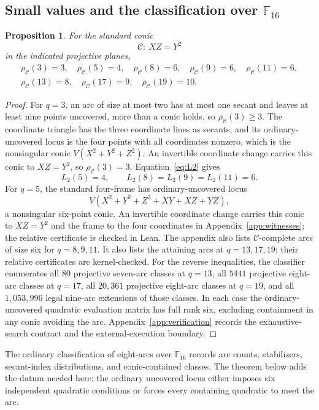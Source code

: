 \documentclass[11pt]{article}
\newtheorem{proposition}[theorem]{Proposition}
\theoremstyle{definition}
\theoremstyle{remark}
\newcommand{\F}{\mathbb{F}}
\newcommand{\cC}{\mathcal{C}}
\newcommand{\rhoC}{\rho_{\cC}}
\begin{document}
\subsection{Small values and the classification over
\texorpdfstring{$\F_{16}$}{F16}}

\begin{proposition}\label{prop:small-values}
For the standard conic
\[
 \cC:\ XZ=Y^2
\]
in the indicated projective planes,
\[
\begin{gathered}
 \rhoC(3)=3,\quad \rhoC(5)=4,\quad \rhoC(8)=6,\quad \rhoC(9)=6,\quad
 \rhoC(11)=6,\\
 \rhoC(13)=8,\quad \rhoC(17)=9,\quad \rhoC(19)=10.
\end{gathered}
\]
\end{proposition}

\begin{proof}
For $q=3$, an arc of size at most two has at most one secant and leaves at
least nine points uncovered, more than a conic holds, so $\rhoC(3)\ge3$.
The coordinate triangle has the three coordinate lines as secants, and its
ordinary-uncovered locus is the four points with all coordinates nonzero,
which is the nonsingular conic $V(X^2+Y^2+Z^2)$.  An invertible coordinate
change carries this conic to $XZ=Y^2$, so $\rhoC(3)=3$.
Equation~\eqref{eq:L2} gives
\[
 L_2(5)=4,
 \qquad
 L_2(8)=L_2(9)=L_2(11)=6.
\]
For $q=5$, the standard four-frame has ordinary-uncovered locus
\[
 V(X^2+Y^2+Z^2+XY+XZ+YZ),
\]
a nonsingular six-point conic.  An invertible coordinate change carries this
conic to $XZ=Y^2$ and the frame to the four coordinates in
Appendix~\ref{app:witnesses}; the relative certificate is checked in Lean.
The appendix also lists $\cC$-complete arcs of size six for $q=8,9,11$.
It also lists the attaining arcs at $q=13,17,19$; their relative
certificates are kernel-checked.  For the reverse inequalities, the
classifier enumerates all $80$ projective seven-arc classes at $q=13$,
all $5441$ projective eight-arc classes at $q=17$, all $20{,}361$ projective
eight-arc classes at $q=19$, and all $1{,}053{,}996$ legal nine-arc extensions
of those classes.  In each case the ordinary-uncovered quadratic evaluation matrix
has full rank six, excluding containment in any conic avoiding the arc.
Appendix~\ref{app:verification} records the exhaustive-search contract and
the external-execution boundary.
\end{proof}

The ordinary classification of eight-arcs over $\F_{16}$ records arc
counts, stabilizers, secant-index distributions, and conic-contained
classes.  The theorem below adds the datum needed here: the ordinary
uncovered locus either imposes six independent quadratic conditions or
forces every containing quadratic to meet the arc.
\end{document}
